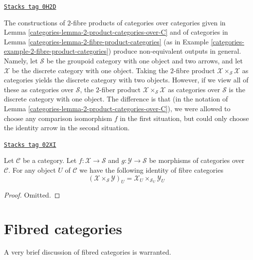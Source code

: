 \begin{example}
\label{categories-example-different-2-fibre-products}
\href{https://stacks.math.columbia.edu/tag/0H2D}{\texttt{Stacks tag 0H2D}}

The constructions of $2$-fibre products of categories over categories given in
Lemma \ref{categories-lemma-2-product-categories-over-C} and of categories in
Lemma \ref{categories-lemma-2-fibre-product-categories}
(as in Example \ref{categories-example-2-fibre-product-categories})
produce non-equivalent outputs in general.
Namely, let $\mathcal{S}$ be the groupoid category with one object and two
arrows, and let $\mathcal{X}$ be the discrete category with one object.
Taking the $2$-fibre product $\mathcal{X} \times_\mathcal{S} \mathcal{X}$
as categories yields the discrete category with two objects. However, if
we view all of these as categories over $\mathcal{S}$, the
$2$-fiber product $\mathcal{X} \times_\mathcal{S} \mathcal{X}$
as categories over $\mathcal{S}$ is the discrete category with one object.
The difference is that (in the notation of
Lemma \ref{categories-lemma-2-product-categories-over-C}), we were allowed to choose
any comparison isomorphism $f$ in the first situation, but could only
choose the identity arrow in the second situation.
\end{example}

\begin{lemma}
\label{categories-lemma-fibre-2-fibre-product-categories-over-C}
\href{https://stacks.math.columbia.edu/tag/02XI}{\texttt{Stacks tag 02XI}}

Let $\mathcal{C}$ be a category.
Let $f : \mathcal{X} \to \mathcal{S}$ and
$g : \mathcal{Y} \to \mathcal{S}$ be morphisms of categories over
$\mathcal{C}$. For any object $U$ of $\mathcal{C}$ we have
the following identity of
fibre categories
$$
\left(\mathcal{X} \times_\mathcal{S}\mathcal{Y}\right)_U
=
\mathcal{X}_U \times_{\mathcal{S}_U} \mathcal{Y}_U
$$
\end{lemma}

\begin{proof}
Omitted.
\end{proof}

\section{Fibred categories}
\label{categories-section-fibred-categories}
A very brief discussion of fibred categories is warranted.

